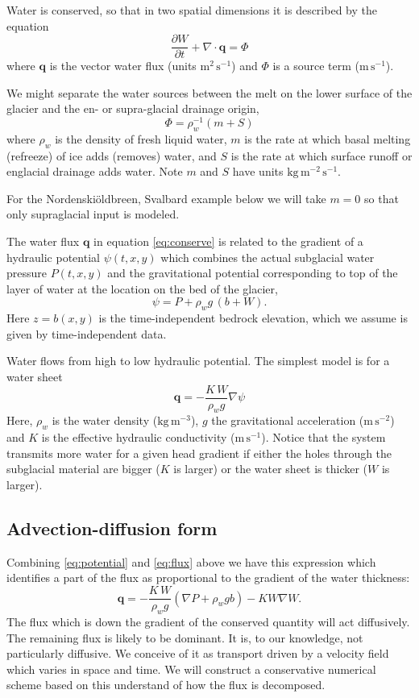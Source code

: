 \documentclass[12pt,final]{amsart}%
\newcommand\bq{\mathbf{q}}
\newcommand{\Div}{\nabla\cdot}
\newcommand{\grad}{\nabla}
\begin{document}
Water is conserved, so that in two spatial dimensions it is described by the equation \citep{Clarke05}
\begin{equation} \label{eq:conserve}
\frac{\partial W}{\partial t} + \Div \bq = \Phi
\end{equation}
where $\bq$ is the vector water flux (units $\text{m}^2\,\text{s}^{-1}$) and $\Phi$ is a source term ($\text{m}\,\text{s}^{-1}$).

We might separate the water sources between the melt on the lower surface of the glacier and the en- or supra-glacial drainage origin,
  $$\Phi = \rho_w^{-1} \left(m + S\right)$$
where $\rho_w$ is the density of fresh liquid water, $m$ is the rate at which basal melting (refreeze) of ice adds (removes) water, and $S$ is the rate at which surface runoff or englacial drainage adds water.  Note $m$ and $S$ have units $\text{kg}\,\text{m}^{-2}\,\text{s}^{-1}$.

\newcommand{\Nbreen}{Nordenski\"oldbreen\xspace}
For the \Nbreen, Svalbard example below we will take $m=0$ so that only supraglacial input is modeled.

The water flux $\bq$ in equation \eqref{eq:conserve} is related to the gradient of a hydraulic potential $\psi(t,x,y)$ which combines the actual subglacial water pressure $P(t,x,y)$ and the gravitational potential corresponding to top of the layer of water at the location on the bed of the glacier,
\begin{equation} \label{eq:potential}
\psi = P + \rho_w g\, (b+W).
\end{equation}
Here $z=b(x,y)$ is the time-independent bedrock elevation, which we assume is given by time-independent data.

Water flows from high to low hydraulic potential.  The simplest model is for a water sheet \citep{Clarke05}
\begin{equation}  \label{eq:flux}
\bq = - \frac{K \, W}{\rho_w g} \grad \psi
\end{equation}
Here, $\rho_w$ is the water density ($\text{kg}\,\text{m}^{-3}$), $g$ the gravitational acceleration ($\text{m}\,\text{s}^{-2}$) and $K$ is the effective hydraulic conductivity ($\text{m}\,\text{s}^{-1}$).  Notice that the system transmits more water for a given head gradient if either the holes through the subglacial material are bigger ($K$ is larger) or the water sheet is thicker ($W$ is larger).

\subsection*{Advection-diffusion form}  Combining \eqref{eq:potential} and \eqref{eq:flux} above we have this expression which identifies a part of the flux as proportional to the gradient of the water thickness:
	$$\bq = - \frac{K\, W}{\rho_w g} \left(\grad P + \rho_w g b\right) - K W \grad W.$$
The flux which is down the gradient of the conserved quantity will act diffusively.  The remaining flux is likely to be dominant.  It is, to our knowledge, not particularly diffusive.  We conceive of it as transport driven by a velocity field which varies in space and time.  We will construct a conservative numerical scheme based on this understand of how the flux is decomposed.
\end{document}
